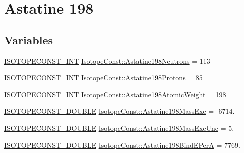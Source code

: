 \hypertarget{group___isotope_const-_astatine-_at198}{}\section{Astatine 198}
\label{group___isotope_const-_astatine-_at198}
\subsection*{Variables}
\begin{DoxyCompactItemize}
\item 
\mbox{\hyperlink{group___isotope_const-_macros_ga5f18360b3e99483a35c32d789e62621c}{I\+S\+O\+T\+O\+P\+E\+C\+O\+N\+S\+T\+\_\+\+I\+NT}} \mbox{\hyperlink{group___isotope_const-_astatine-_at198_ga7d7a09a998d3ab6949d8bda1ca00beff}{Isotope\+Const\+::\+Astatine198\+Neutrons}} = 113
\item 
\mbox{\hyperlink{group___isotope_const-_macros_ga5f18360b3e99483a35c32d789e62621c}{I\+S\+O\+T\+O\+P\+E\+C\+O\+N\+S\+T\+\_\+\+I\+NT}} \mbox{\hyperlink{group___isotope_const-_astatine-_at198_gac14682d81f65506bee79be4ec400ab33}{Isotope\+Const\+::\+Astatine198\+Protons}} = 85
\item 
\mbox{\hyperlink{group___isotope_const-_macros_ga5f18360b3e99483a35c32d789e62621c}{I\+S\+O\+T\+O\+P\+E\+C\+O\+N\+S\+T\+\_\+\+I\+NT}} \mbox{\hyperlink{group___isotope_const-_astatine-_at198_ga47099d1e1bea67ee2040cd896efe86f5}{Isotope\+Const\+::\+Astatine198\+Atomic\+Weight}} = 198
\item 
\mbox{\hyperlink{group___isotope_const-_macros_ga8f45a7272ce02c0b4c65c44636ed719a}{I\+S\+O\+T\+O\+P\+E\+C\+O\+N\+S\+T\+\_\+\+D\+O\+U\+B\+LE}} \mbox{\hyperlink{group___isotope_const-_astatine-_at198_gaf78f6fd8e45eaf118bd91f4c2f94f857}{Isotope\+Const\+::\+Astatine198\+Mass\+Exc}} = -\/6714.
\item 
\mbox{\hyperlink{group___isotope_const-_macros_ga8f45a7272ce02c0b4c65c44636ed719a}{I\+S\+O\+T\+O\+P\+E\+C\+O\+N\+S\+T\+\_\+\+D\+O\+U\+B\+LE}} \mbox{\hyperlink{group___isotope_const-_astatine-_at198_ga13ef32611e9c20c1fac8ad20dfd1a280}{Isotope\+Const\+::\+Astatine198\+Mass\+Exc\+Unc}} = 5.
\item 
\mbox{\hyperlink{group___isotope_const-_macros_ga8f45a7272ce02c0b4c65c44636ed719a}{I\+S\+O\+T\+O\+P\+E\+C\+O\+N\+S\+T\+\_\+\+D\+O\+U\+B\+LE}} \mbox{\hyperlink{group___isotope_const-_astatine-_at198_gabd1512467ba90028d2ae4945bb1b7e01}{Isotope\+Const\+::\+Astatine198\+Bind\+E\+PerA}} = 7769.
\item 

\end{DoxyCompactItemize}
